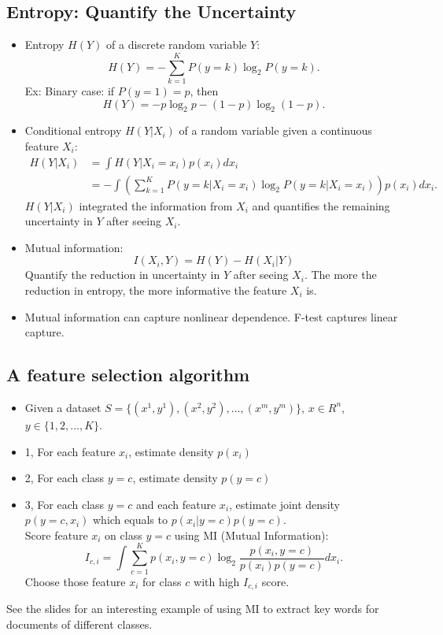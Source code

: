 \documentclass[twoside,12pt]{article}
\begin{document}
\subsection{Entropy: Quantify the Uncertainty}
\begin{itemize}
\item Entropy $H(Y)$ of a discrete random variable $Y$:
$$H(Y) = -\sum_{k=1}^K P(y=k) \log_2 P(y=k).$$
Ex: Binary case: if $P(y=1) = p$, then
 $$H(Y) = -p\log_2 p - (1-p)\log_2(1-p).$$
 
 \item Conditional entropy $H(Y|X_i)$ of a random variable given a continuous feature $X_i$:
  \begin{align*}
  H(Y|X_i) & = \int H(Y| X_i = x_i) p(x_i) dx_i \\
  & = -\int \left ( \sum_{k=1}^K P(y=k|X_i = x_i) \log_2 P(y=k|X_i = x_i) \right ) p(x_i) dx_i. 
  \end{align*}
  $H(Y|X_i)$ integrated the information from $X_i$ and quantifies the remaining uncertainty in $Y$ after seeing $X_i$.
  \item Mutual information: $$I(X_i, Y) = H(Y) - H(X_i | Y)$$
  Quantify the reduction in uncertainty in $Y$ after seeing $X_i$. The more the reduction in entropy, the more informative the feature $X_i$ is.
  \item Mutual information can capture nonlinear dependence. F-test captures linear capture. 
\end{itemize}

\subsection{A feature selection algorithm}
\begin{itemize}
\item Given a dataset $S = \{(x^1,y^1), (x^2, y^2), ..., (x^m, y^m)\}$, $x \in R^n$, $y \in \{1,2, ..., K\}$.
\item 1, For each feature $x_i$, estimate density $p(x_i)$
\item 2, For each class $y = c$, estimate density $p(y=c)$
\item 3, For each class $y = c$ and each feature $x_i$, estimate joint density $p(y=c, x_i)$ which equals to $p(x_i | y =c) p(y=c)$.\\
Score feature $x_i$ on class $y=c$ using MI (Mutual Information):
$$I_{c,i} = \int \sum_{c=1}^K p(x_i, y=c) \log_2 \frac{p(x_i, y = c)}{p(x_i)p(y=c)}dx_i.$$
Choose those feature $x_i$ for class $c$ with high $I_{c,i}$ score.
\end{itemize}
See the slides for an interesting example of using MI to extract key words for documents of different classes.
\end{document}
